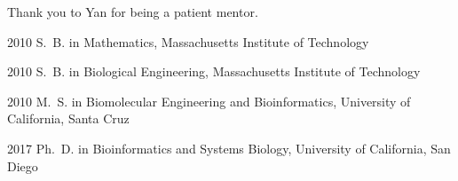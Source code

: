 \begin{frontmatter}
%
%
\begin{acknowledgements}
 Thank you to Yan for being a patient mentor.
\end{acknowledgements}


%
%
\begin{vitapage}
\begin{vita}
  \item[2010] S.~B. in Mathematics, Massachusetts Institute of Technology
  \item[2010] S.~B. in Biological Engineering, Massachusetts Institute of Technology
  \item[2010] M.~S. in Biomolecular Engineering and Bioinformatics, University of California, Santa Cruz
  \item[2017] Ph.~D. in Bioinformatics and Systems Biology, University of California, San Diego
\end{vita}


\end{vitapage}
\end{frontmatter}
